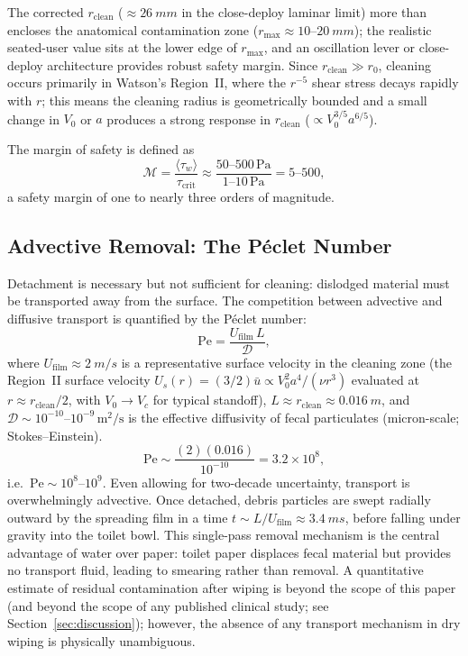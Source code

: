 \documentclass[aps,prfluids,reprint,amsmath,amssymb,floatfix]{revtex4-2}
\newcommand{\Pe}{\mathrm{Pe}}
\begin{document}
The corrected $r_\mathrm{clean}$ ($\approx \SI{26}{mm}$ in the
close-deploy laminar limit) more than encloses the anatomical
contamination zone ($r_\mathrm{max} \approx 10$--$\SI{20}{mm}$); the
realistic seated-user value sits at the lower edge of $r_\mathrm{max}$,
and an oscillation lever or close-deploy architecture provides
robust safety margin. Since $r_\mathrm{clean} \gg r_0$, cleaning
occurs primarily in Watson's Region~II, where the $r^{-5}$ shear stress
decays rapidly with $r$; this means the cleaning radius is geometrically
bounded and a small change in $V_0$ or $a$ produces a strong response in
$r_\mathrm{clean}$ ($\propto V_0^{3/5} a^{6/5}$).

The margin of safety is defined as
\begin{equation}
    \mathcal{M} = \frac{\langle\tau_w\rangle}{\tau_\mathrm{crit}} \approx
    \frac{50\text{--}500\,\mathrm{Pa}}{1\text{--}10\,\mathrm{Pa}} = 5\text{--}500,
    \label{eq:margin}
\end{equation}
a safety margin of one to nearly three orders of magnitude.

\subsection{Advective Removal: The P\'{e}clet Number}
\label{subsec:peclet}

Detachment is necessary but not sufficient for cleaning: dislodged material
must be transported away from the surface. The competition between advective
and diffusive transport is quantified by the P\'{e}clet number:
\begin{equation}
    \Pe = \frac{U_\mathrm{film}\,L}{\mathcal{D}},
    \label{eq:peclet}
\end{equation}
where $U_\mathrm{film} \approx \SI{2}{m/s}$ is a representative surface
velocity in the cleaning zone (the Region~II surface velocity
$U_s(r) = (3/2)\bar u \propto V_0^2 a^4/(\nu r^3)$ evaluated at
$r \approx r_\mathrm{clean}/2$, with $V_0 \to V_c$ for typical standoff),
$L \approx r_\mathrm{clean} \approx \SI{0.016}{m}$,
and $\mathcal{D} \sim 10^{-10}$--$10^{-9}\,\mathrm{m^2/s}$ is the effective
diffusivity of fecal particulates (micron-scale; Stokes--Einstein).
\begin{equation}
    \Pe \sim \frac{(2)(0.016)}{10^{-10}} = 3.2 \times 10^8,
    \label{eq:peval}
\end{equation}
i.e.\ $\Pe \sim 10^{8}$--$10^9$. Even allowing for two-decade
uncertainty, transport is overwhelmingly advective. Once detached, debris particles are
swept radially outward by the spreading film in a time $t \sim L/U_\mathrm{film}
\approx \SI{3.4}{ms}$, before falling under gravity into the toilet bowl.
This single-pass removal mechanism is the central advantage of water over
paper: toilet paper displaces fecal material but provides no transport fluid,
leading to smearing rather than removal. A quantitative estimate of residual
contamination after wiping is beyond the scope of this paper (and beyond
the scope of any published clinical study; see Section~\ref{sec:discussion});
however, the absence of any transport mechanism in dry wiping is physically
unambiguous.
\end{document}
